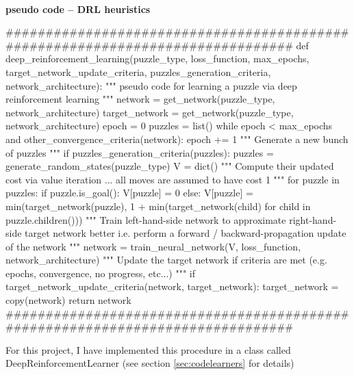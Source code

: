 \paragraph{}{\textbf{pseudo code -- \textbf{DRL} heuristics}}
\begin{python}
###############################################################################
def deep_reinforcement_learning(puzzle_type,
                                loss_function,
                                max_epochs,
                                target_network_update_criteria,
                                puzzles_generation_criteria,
                                network_architecture):
    """ pseudo code for learning a puzzle via deep reinforcement learning """
    network = get_network(puzzle_type, network_architecture)
    target_network = get_network(puzzle_type, network_architecture)
    epoch = 0
    puzzles = list()
    while epoch < max_epochs and other_convergence_criteria(network):
        epoch += 1
        """ Generate a new bunch of puzzles """
        if puzzles_generation_criteria(puzzles):
            puzzles = generate_random_states(puzzle_type)
        V = dict()
        """ Compute their updated cost via value iteration ... 
             all moves are assumed to have cost 1 """
        for puzzle in puzzles:
            if puzzle.is_goal():
                V[puzzle] = 0
            else:
                V[puzzle] = min(target_network(puzzle),
                                1 + min(target_network(child) for child in puzzle.children()))
        """ Train left-hand-side network to approximate right-hand-side target network better
        i.e. perform a forward / backward-propagation update of the network
        """
        network = train_neural_network(V,
                                       loss_function,
                                       network_architecture)
        """ Update the target network if criteria are met 
        (e.g. epochs, convergence, no progress, etc...) """
        if target_network_update_criteria(network, target_network):
            target_network = copy(network)
    return network
###############################################################################
\end{python}
\black
For this project, I have implemented this procedure in a class called DeepReinforcementLearner (see section \ref{sec:codelearners} for details)



